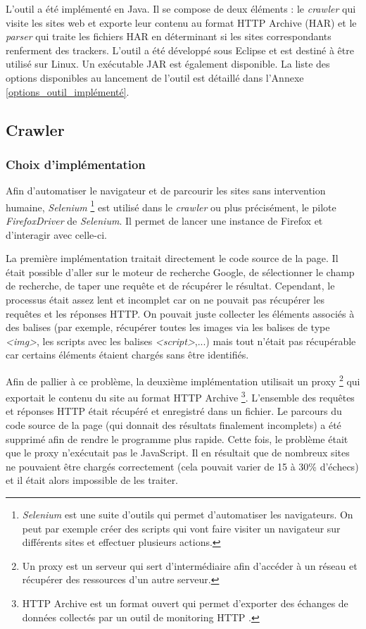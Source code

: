 L'outil a été implémenté en Java. Il se compose de deux éléments : le \textit{crawler} qui visite les sites web et exporte leur contenu au format HTTP Archive (HAR) et le \textit{parser} qui traite les fichiers HAR en déterminant si les sites correspondants renferment des trackers.
L'outil a été développé sous Eclipse et est destiné à être utilisé sur Linux. Un exécutable JAR est également disponible.
La liste des options disponibles au lancement de l'outil est détaillé dans l'Annexe \ref{options_outil_implémenté}.
\newline

\subsection{Crawler}
\label{crawler}
\subsubsection{Choix d'implémentation}
Afin d'automatiser le navigateur et de parcourir les sites sans intervention humaine, \textit{Selenium} \footnote {\textit{Selenium} \cite{selenium_homepage} est une suite d'outils qui permet d'automatiser les navigateurs. On peut par exemple créer des scripts qui vont faire visiter un navigateur sur différents sites et effectuer plusieurs actions.} est utilisé dans le \textit{crawler} ou plus précisément, le pilote \textit{FirefoxDriver} de \textit{Selenium}. Il permet de lancer une instance de Firefox et d'interagir avec celle-ci.

La première implémentation traitait directement le code source de la page. Il était possible d'aller sur le moteur de recherche Google, de sélectionner le champ de recherche, de taper une requête et de récupérer le résultat. Cependant, le processus était assez lent et incomplet car on ne pouvait pas récupérer les requêtes et les réponses HTTP. On pouvait juste collecter les éléments associés à des balises (par exemple, récupérer toutes les images via les balises de type \textit{<img>}, les scripts avec les balises \textit{<script>},...) mais tout n'était pas récupérable car certains éléments étaient chargés sans être identifiés.

Afin de pallier à ce problème, la deuxième implémentation utilisait un proxy \footnote{Un proxy est un serveur qui sert d'intermédiaire afin d'accéder à un réseau et récupérer des ressources d'un autre serveur.} qui exportait le contenu du site au format HTTP Archive \footnote{HTTP Archive est un format ouvert qui permet d'exporter des échanges de données collectés par un outil de monitoring HTTP \cite{har_spec}.}. L'ensemble des requêtes et réponses HTTP était récupéré et enregistré dans un fichier. Le parcours du code source de la page (qui donnait des résultats finalement incomplets) a été supprimé afin de rendre le programme plus rapide. Cette fois, le problème était que le proxy n'exécutait pas le JavaScript. Il en résultait que de nombreux sites ne pouvaient être chargés correctement (cela pouvait varier de 15 à 30\% d'échecs) et il était alors impossible de les traiter.

